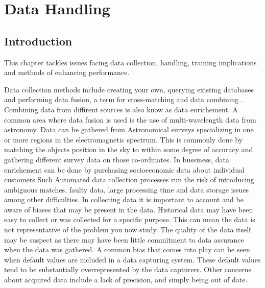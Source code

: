 
\chapter{Data Handling} %

\label{Chapter2} %



\section{Introduction}

This chapter tackles issues facing data collection, handling, training implications and methods of enhancing performance.


Data collection methods include creating your own, querying existing databases and performing data fusion, a term for cross-matching and data combining \citep{ball2010data}.
Combining data from diffirent sources is also know as data enrichement.
A common area where data fusion is used is the use of multi-wavelength data from astronomy.
Data can be gathered from Astronomical surveys specializing in one or more regions in the electromagnetic spectrum.
This is commonly done by matching the objects position in the sky to within some degree of accuracy and gathering different survey data on those co-ordinates.
In bussiness, data enrichement can be done by purchasing socioeconomic data about individual customers 
Such Automated data collection processes run the risk of introducing ambiguous matches, faulty data, large processing time and data storage issues among other difficulties.
In collecting data it is important to account and be aware of biases that may be present in the data.
Historical data may have been easy to collect or was collected for a specific purpose.
This can mean the data is not representative of the problem you now study.
The quality of the data itself may be suspect as there may have been little commitment to data assurance when the data was gathered.
A common bias that comes into play can be seen when default values are included in a data capturing system.
These default values tend to be substantially overrepresented by the data capturers.
Other concerns about acquired data include a lack of precision, and simply being out of date.


